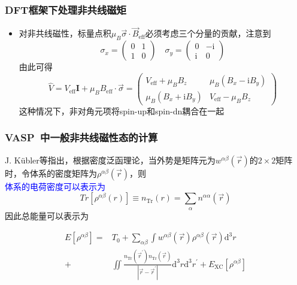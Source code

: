 {\frame
{
	\frametitle{\textrm{DFT}框架下处理非共线磁矩}
\begin{itemize}
	\item 对\textrm{非共线磁性}，标量点积$\mu_B\vec\sigma\cdot\vec B_{\mathrm{eff}}$必须考虑三个分量的贡献，注意到
\begin{displaymath}
	\sigma_x=\left(
	\begin{matrix}
		0 &1\\
		1 &0
	\end{matrix}\right)\quad
	\sigma_y=\left(
	\begin{matrix}
		0 &-\mathrm{i}\\
		\mathrm{i} &0
	\end{matrix}\right)
\end{displaymath}
由此可得
		\begin{displaymath}
			\hat V=V_{\mathrm{eff}}\mathbf{I}+\mu_BB_{\mathrm{eff}}\cdot\vec\sigma=\left(
			\begin{matrix}
				V_{\mathrm{eff}}+\mu_BB_z &\mu_B(B_x-\mathrm{i}B_y)\\
				\mu_B(B_x+\mathrm{i}B_y) &V_{\mathrm{eff}}-\mu_BB_z
			\end{matrix}\right)
		\end{displaymath}
		这种情况下，非对角元项将\textrm{spin-up}和\textrm{spin-dn}耦合在一起

\end{itemize}
}

\frame
{
	\frametitle{\textrm{VASP~}中一般非共线磁性态的计算}
	\textrm{J. K\"ubler}等指出，根据密度泛函理论，当外势是矩阵元为$w^{\alpha\beta}(\vec r)$的$2\times2$矩阵时，令体系的密度矩阵为$\rho^{\alpha\beta}(\vec r)$，则\\
	\textcolor{blue}{体系的电荷密度可以表示为}
	\begin{displaymath}
		Tr[\rho^{\alpha\beta}(r)]\equiv n_{\mathrm{Tr}}(r)=\sum_{\alpha}n^{\alpha\alpha}(\vec r)
	\end{displaymath}
	因此总能量可以表示为
	
	\begin{displaymath}
		\begin{aligned}
			E[\rho^{\alpha\beta}]=&T_0+\sum_{\alpha\beta}\int w^{\alpha\beta}(\vec r)\rho^{\alpha\beta}(\vec r)\mathrm{d}^3r\\
			+&\iint\frac{n_{\mathrm{Tr}}(\vec r^{\prime})n_{\mathrm{Tr}}(\vec r)}{|\vec r-\vec r^{\prime}|}\mathrm{d}^3r\mathrm{d}^3r^{\prime}+E_{\mathrm{XC}}[\rho^{\alpha\beta}]
		\end{aligned}
	\end{displaymath}
}

}
